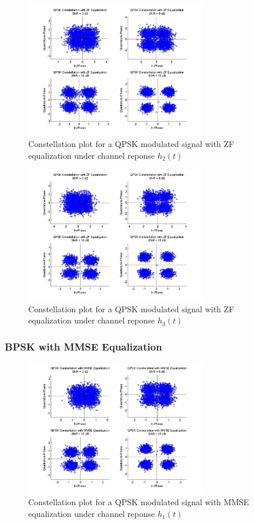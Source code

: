 \documentclass[]{article}
\begin{document}
\begin{figure}[H]
\centering
\includegraphics[width=0.7\textwidth]{qpConstZF2.jpg}
\caption{Constellation plot for a QPSK modulated signal with ZF equalization under channel reponse $h_2(t)$}
\end{figure}

\begin{figure}[H]
\centering
\includegraphics[width=0.7\textwidth]{qpConstZF3.jpg}
\caption{Constellation plot for a QPSK modulated signal with ZF equalization under channel reponse $h_3(t)$}
\end{figure}

\subsubsection{BPSK with MMSE Equalization}

\begin{figure}[H]
\centering
\includegraphics[width=0.7\textwidth]{qpConstMMSE1.jpg}
\caption{Constellation plot for a QPSK modulated signal with MMSE equalization under channel reponse $h_1(t)$}
\end{figure}
\end{document}
